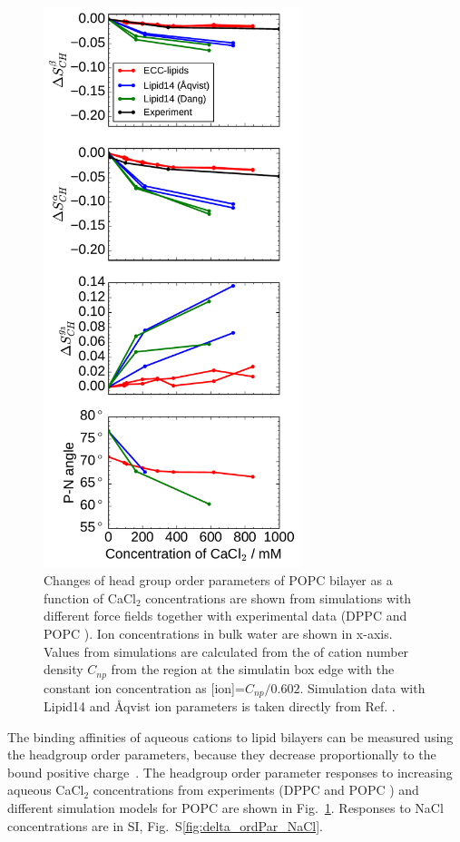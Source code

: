 \documentclass[aip,jcp,twocolumn]{revtex4}
\begin{document}
\begin{figure}[tbp]
  \centering
  \includegraphics[width=7.5cm]{../Fig/ipython_nb/PN_angle_OrdPars-A-B-g3_L14-ECCL17_q80_sig89_CaCl.pdf}
  \caption{\label{fig:delta_ordPar_CaCl}
    Changes of head group order parameters of POPC bilayer as a function of CaCl$_2$ concentrations
    are shown from simulations with different force fields together with experimental data 
    (DPPC \cite{akutsu81} and POPC \cite{altenbach84}). 
    Ion concentrations in bulk water are shown in x-axis. 
    Values from simulations are calculated from the of cation number density $C_{np}$
    from the region at the simulatin box edge with the constant ion concentration as [ion]=$C_{np}/0.602$.
    Simulation data with Lipid14 and \AA{}qvist ion parameters is taken directly from Ref. \cite{catte16}.
  }
\end{figure}

The binding affinities of aqueous cations to lipid 
bilayers can be measured using the headgroup 
order parameters, because they decrease proportionally  
to the bound positive charge~\cite{seelig87,catte16}. 
The headgroup order parameter responses 
to increasing aqueous CaCl$_2$ concentrations 
from experiments (DPPC \cite{akutsu81} 
and POPC \cite{altenbach84}) and different simulation models for POPC 
are shown in Fig.~\ref{fig:delta_ordPar_CaCl}.
Responses to NaCl concentrations are in SI, Fig.~S\ref{fig:delta_ordPar_NaCl}.
\end{document}

